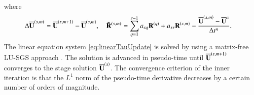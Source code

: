{\begin{equation}
\end{equation}
where
\begin{equation}
    \label{eq:define-inc}
    \mathrm\Delta \overline{\mathbf{U}}^{\left(s,m\right)}= 
    \overline{\mathbf{U}}^{\left(s,m+1\right)} - \overline{\mathbf{U}}^{\left(s,m\right)}, \quad 
    \tilde{\mathbf{R}}^{\left(s,m\right)}= 
    \sum_{q=1}^{s-1} a_{sq} \mathbf{R}^{\left(q\right)} + 
    a_{ss} \mathbf{R}^{\left(s,m\right)} - 
    \dfrac{\overline{\mathbf{U}}^{\left(s,m\right)} - \overline{\mathbf{U}}^{n}}{\mathrm\Delta t^n}.
\end{equation}
The linear equation system \eqref{eq:linearTauUpdate} is solved by using a matrix-free LU-SGS approach \cite{luo1998fast}. The solution is advanced in pseudo-time until $\overline{\mathbf{U}}^{\left(s,m+1\right)}$ converges to the stage solution $\overline{\mathbf{U}}^{\left(s\right)}$. The convergence criterion of the inner iteration is that the $L^1$ norm of the pseudo-time derivative decreases by a certain number of orders of magnitude.
}
